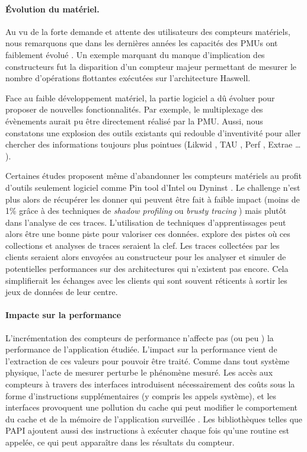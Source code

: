      
        \paragraph{Évolution du matériel.}
            Au vu de la forte demande et attente des utilisateurs des compteurs matériels, nous remarquons que dans les dernières années les capacités des PMUs ont faiblement évolué \cite{Intel2017}. Un exemple marquant du manque d'implication des constructeurs fut la disparition d'un compteur majeur permettant de mesurer le nombre d'opérations flottantes exécutées sur l'architecture Haswell.

            Face au faible développement matériel, la partie logiciel a dû évoluer pour proposer de nouvelles fonctionnalités. Par exemple, le multiplexage des évènements aurait pu être directement réalisé par la PMU. Aussi, nous constatons une explosion des outils existants qui redouble d'inventivité pour aller chercher des informations toujours plus pointues (Likwid \cite{Treibig2011}, TAU \cite{Shende2006}, Perf \cite{Weaver2013}, Extrae \cite{Markomanolis2014} … ). 

            Certaines études \cite{Moseley2011} proposent même d'abandonner les compteurs matériels au profit d'outils seulement logiciel comme Pin tool d'Intel \cite{RobertD.2011} ou Dyninst \cite{RobertD.2011, Laurenzano2012}. Le challenge n'est plus alors de récupérer les donner qui peuvent être fait à faible impact (moins de 1\% grâce à des techniques de \textit{shadow profiling} ou \textit{brusty tracing} \cite{Moseley2011}) mais plutôt dans l'analyse de ces traces. L'utilisation de techniques d'apprentissages peut alors être une bonne piste pour valoriser ces données. \cite{Moseley2011} explore des pistes où ces collections et analyses de traces seraient la clef. Les traces collectées par les clients seraient alors envoyées au constructeur pour les analyser et simuler de potentielles performances sur des architectures qui n'existent pas encore. Cela simplifierait les échanges avec les clients qui sont souvent réticents à sortir les jeux de données de leur centre.

        \paragraph{Impacte sur la performance}
        
            L'incrémentation des compteurs de performance n'affecte pas (ou peu \cite{Rohl2015}) la performance de l'application étudiée. L'impact sur la performance vient de l'extraction de ces valeurs pour pouvoir être traité. Comme dans tout système physique, l'acte de mesurer perturbe le phénomène mesuré. Les accès aux compteurs à travers des interfaces introduisent nécessairement des coûts sous la forme d'instructions supplémentaires (y compris les appels système), et les interfaces provoquent une pollution du cache qui peut modifier le comportement du cache et de la mémoire de l'application surveillée \cite{Weaver2015}. Les bibliothèques telles que PAPI ajoutent aussi des instructions à exécuter chaque fois qu'une routine est appelée, ce qui peut apparaître dans les résultats du compteur. 
            
